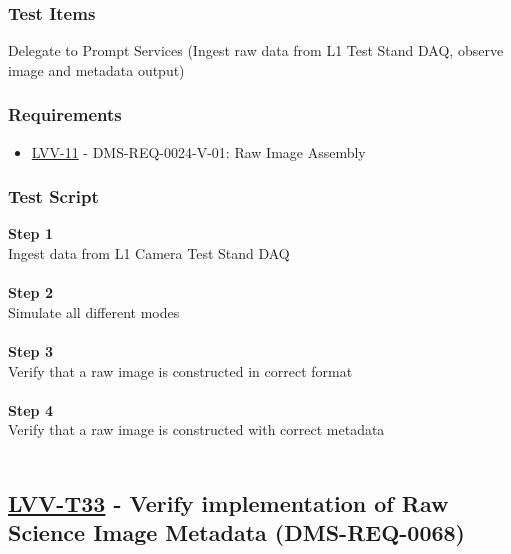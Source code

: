 \hypertarget{test-items-121}{%
\subsubsection{Test Items}\label{test-items-121}}

Delegate to Prompt Services (Ingest raw data from L1 Test Stand DAQ,
observe image and metadata output)

\hypertarget{requirements-122}{%
\subsubsection{Requirements}\label{requirements-122}}

\begin{itemize}
\tightlist
\item
  \href{https://jira.lsstcorp.org/browse/LVV-11}{LVV-11} -
  DMS-REQ-0024-V-01: Raw Image Assembly
\end{itemize}

\hypertarget{test-script-122}{%
\subsubsection{Test Script}\label{test-script-122}}

\textbf{Step 1}\\
Ingest data from L1 Camera Test Stand DAQ\\
~\\
\textbf{Step 2}\\
Simulate all different modes\\
~\\
\textbf{Step 3}\\
Verify that a raw image is constructed in correct format\\
~\\
\textbf{Step 4}\\
Verify that a raw image is constructed with correct metadata\\
~\\

\hypertarget{lvv-t33---verify-implementation-of-raw-science-image-metadata-dms-req-0068}{%
\subsection{\texorpdfstring{\href{https://jira.lsstcorp.org/secure/Tests.jspa\#/testCase/LVV-T33}{LVV-T33}
- Verify implementation of Raw Science Image Metadata
(DMS-REQ-0068)}{LVV-T33 - Verify implementation of Raw Science Image Metadata (DMS-REQ-0068)}}\label{lvv-t33---verify-implementation-of-raw-science-image-metadata-dms-req-0068}}

